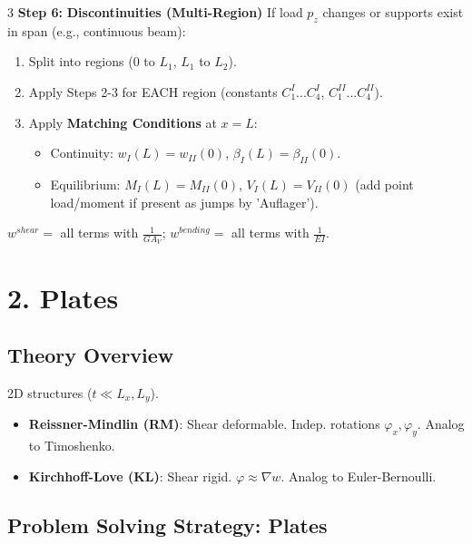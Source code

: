 \documentclass[8pt]{extarticle}
\newcommand{\step}[1]{\textbf{\scriptsize Step #1:}}
\begin{document}
\begin{multicols*}{3}
\step{6} \textbf{Discontinuities (Multi-Region)}
If load $p_z$ changes or supports exist in span (e.g., continuous beam):
\begin{enumerate}
    \item Split into regions (0 to $L_1$, $L_1$ to $L_2$).
    \item Apply Steps 2-3 for EACH region (constants $C_1^I...C_4^I$, $C_1^{II}...C_4^{II}$).
    \item Apply \textbf{Matching Conditions} at $x=L$: 
    \begin{itemize}
        \item Continuity: $w_I(L) = w_{II}(0)$, $\beta_I(L) = \beta_{II}(0)$.
        \item Equilibrium: $M_I(L) = M_{II}(0)$, $V_I(L) = V_{II}(0)$ (add point load/moment if present as jumps by 'Auflager').
    \end{itemize}
\end{enumerate}
$w^{shear} = $ all terms with $\frac{1}{GA_V}$; $w^{bending}=$ all terms with $\frac{1}{EI}$.

\section{2. Plates}
\subsection{Theory Overview}
2D structures ($t \ll L_x, L_y$).
\begin{itemize}[leftmargin=*]
    \item \textbf{Reissner-Mindlin (RM)}: Shear deformable. Indep. rotations $\varphi_x, \varphi_y$. Analog to Timoshenko.
    \item \textbf{Kirchhoff-Love (KL)}: Shear rigid. $\varphi \approx \nabla w$. Analog to Euler-Bernoulli.
\end{itemize}

\subsection{Problem Solving Strategy: Plates}


\end{multicols*}
\end{document}

